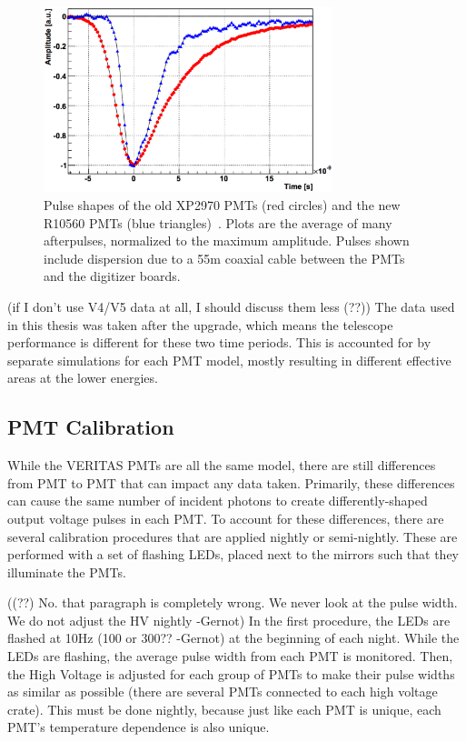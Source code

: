 \begin{figure}[ht]
  \centering
  \includegraphics[width=0.75\textwidth]{images/pmt_models_pulsewidths.eps}
  \caption[Pulse Shapes]{
    Pulse shapes of the old XP2970 PMTs (red circles) and the new R10560 PMTs (blue triangles)~\cite{pmtmodels}.
    Plots are the average of many afterpulses, normalized to the maximum amplitude.
    Pulses shown include dispersion due to a \nicetilde55m coaxial cable between the PMTs and the digitizer boards.}
  \label{fig:pmt_pulse_widths}
\end{figure}

{\color{red}(if I don't use V4/V5 data at all, I should discuss them less (??))}
The data used in this thesis was taken after the upgrade, which means the telescope performance is different for these two time periods.
This is accounted for by separate simulations for each PMT model, mostly resulting in different effective areas at the lower energies.


\subsection{PMT Calibration}

While the VERITAS PMTs are all the same model, there are still differences from PMT to PMT that can impact any data taken.
Primarily, these differences can cause the same number of incident photons to create differently-shaped output voltage pulses in each PMT.
To account for these differences, there are several calibration procedures that are applied nightly or semi-nightly.
These are performed with a set of flashing LEDs, placed next to the mirrors such that they illuminate the PMTs.

{\color{red}((??) No. that paragraph is completely wrong. We never look at the pulse width. We do not adjust the HV nightly -Gernot)}
In the first procedure, the LEDs are flashed at \nicetilde10Hz {\color{red}(100 or 300?? -Gernot)} at the beginning of each night.
While the LEDs are flashing, the average pulse width from each PMT is monitored.
Then, the High Voltage is adjusted for each group of PMTs to make their pulse widths as similar as possible (there are several PMTs connected to each high voltage crate).
This must be done nightly, because just like each PMT is unique, each PMT's temperature dependence is also unique.

